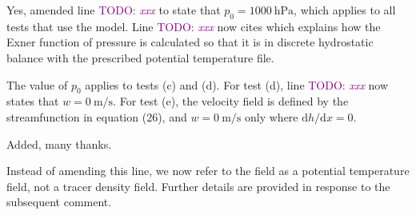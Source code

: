 \documentclass{article}
\newcommand{\TODO}[1]{\textcolor{purple}{TODO: \emph{#1}}}
\begin{document}
\begin{quotation}
	\begin{comment}
	\item Page 18, test c): The initial conditions look incomplete. Please provide information about the initial density or pressure initialization. Do you assume that the pressure at z=0 m is 1000 hPa?
	\end{comment}
\end{quotation}
Yes, amended line \TODO{xxx} to state that $p_0 = \SI{1000}{\hecto\pascal}$, which applies to all tests that use the model.  Line \TODO{xxx} now cites \citet{weller-shahrokhi2014} which explains how the Exner function of pressure is calculated so that it is in discrete hydrostatic balance with the prescribed potential temperature file.

\begin{quotation}
	\begin{comment}
	\item Test d) and e): As for test c), the descriptions of the initial conditions looks incomplete. Is the initial w zero in d,e?
\end{comment}
\end{quotation}
The value of $p_0$ applies to tests (c) and (d).  For test (d), line \TODO{xxx} now states that $w = \SI{0}{\meter\per\second}$.  For test (e), the velocity field is defined by the streamfunction in equation (26), and $w = \SI{0}{\meter\per\second}$ only where $\mathrm{d}h/\mathrm{d}x = 0$.

\begin{quotation}
	\begin{comment}
	\item Line 389: mu needs the physical unit 1/s.
\end{comment}
\end{quotation}
Added, many thanks.

\begin{quotation}
	\begin{comment}
	\item Line 440: It would be better to say 'The functional form of the initial density field ...potential temperature field (Eq. (22)) in the gravity wave test.
	\end{comment}
\end{quotation}
Instead of amending this line, we now refer to the field as a potential temperature field, not a tracer density field.  Further details are provided in response to the subsequent comment.
\end{document}
